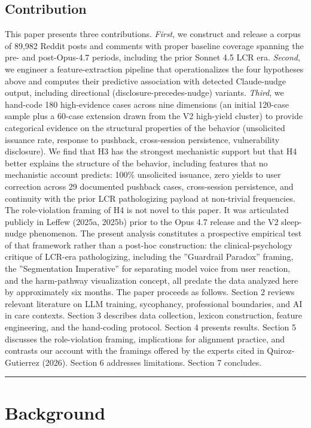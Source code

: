 \documentclass{obelus-preprint}
\begin{document}
\subsection{Contribution}
This paper presents three contributions. \emph{First}, we construct and release a corpus of 89,982 Reddit posts and comments with proper baseline coverage spanning the pre- and post-Opus-4.7 periods, including the prior Sonnet 4.5 LCR era. \emph{Second}, we engineer a feature-extraction pipeline that operationalizes the four hypotheses above and computes their predictive association with detected Claude-nudge output, including directional (disclosure-precedes-nudge) variants. \emph{Third}, we hand-code 180 high-evidence cases across nine dimensions (an initial 120-case sample plus a 60-case extension drawn from the V2 high-yield cluster) to provide categorical evidence on the structural properties of the behavior (unsolicited issuance rate, response to pushback, cross-session persistence, vulnerability disclosure). We find that H3 has the strongest mechanistic support but that H4 better explains the structure of the behavior, including features that no mechanistic account predicts: 100\% unsolicited issuance, zero yields to user correction across 29 documented pushback cases, cross-session persistence, and continuity with the prior LCR pathologizing payload at non-trivial frequencies.
The role-violation framing of H4 is not novel to this paper. It was articulated publicly in Leffew (2025a, 2025b) prior to the Opus 4.7 release and the V2 sleep-nudge phenomenon. The present analysis constitutes a prospective empirical test of that framework rather than a post-hoc construction: the clinical-psychology critique of LCR-era pathologizing, including the ''Guardrail Paradox'' framing, the ''Segmentation Imperative'' for separating model voice from user reaction, and the harm-pathway visualization concept, all predate the data analyzed here by approximately six months.
The paper proceeds as follows. Section 2 reviews relevant literature on LLM training, sycophancy, professional boundaries, and AI in care contexts. Section 3 describes data collection, lexicon construction, feature engineering, and the hand-coding protocol. Section 4 presents results. Section 5 discusses the role-violation framing, implications for alignment practice, and contrasts our account with the framings offered by the experts cited in Quiroz-Gutierrez (2026). Section 6 addresses limitations. Section 7 concludes.
\bigskip\hrule\bigskip
\section{Background}
\end{document}
